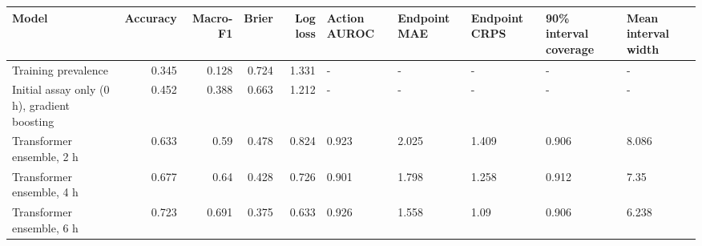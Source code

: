 \begin{tabular}{lrrrrlllll}
\toprule
Model & Accuracy & Macro-F1 & Brier & Log loss & Action AUROC & Endpoint MAE & Endpoint CRPS & 90\% interval coverage & Mean interval width \\
\midrule
Training prevalence & 0.345 & 0.128 & 0.724 & 1.331 & - & - & - & - & - \\
Initial assay only (0 h), gradient boosting & 0.452 & 0.388 & 0.663 & 1.212 & - & - & - & - & - \\
Transformer ensemble, 2 h & 0.633 & 0.59 & 0.478 & 0.824 & 0.923 & 2.025 & 1.409 & 0.906 & 8.086 \\
Transformer ensemble, 4 h & 0.677 & 0.64 & 0.428 & 0.726 & 0.901 & 1.798 & 1.258 & 0.912 & 7.35 \\
Transformer ensemble, 6 h & 0.723 & 0.691 & 0.375 & 0.633 & 0.926 & 1.558 & 1.09 & 0.906 & 6.238 \\
\bottomrule
\end{tabular}
